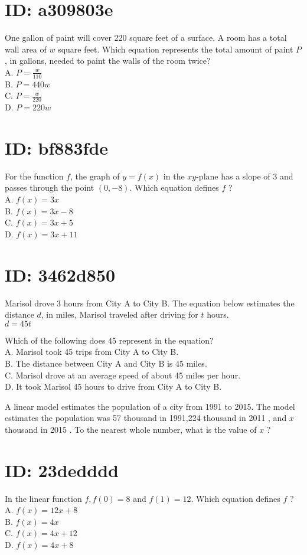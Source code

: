 \section*{ID: a309803e}
One gallon of paint will cover 220 square feet of a surface. A room has a total wall area of $w$ square feet. Which equation represents the total amount of paint $P$, in gallons, needed to paint the walls of the room twice?\\
A. $P=\frac{w}{110}$\\
B. $P=440 w$\\
C. $P=\frac{w}{220}$\\
D. $P=220 w$

\section*{ID: bf883fde}
For the function $f$, the graph of $y=f(x)$ in the $x y$-plane has a slope of 3 and passes through the point $(0,-8)$. Which equation defines $f$ ?\\
A. $f(x)=3 x$\\
B. $f(x)=3 x-8$\\
C. $f(x)=3 x+5$\\
D. $f(x)=3 x+11$

\section*{ID: 3462d850}
Marisol drove 3 hours from City A to City B. The equation below estimates the distance $d$, in miles, Marisol traveled after driving for $t$ hours.\\
$d=45 t$

Which of the following does 45 represent in the equation?\\
A. Marisol took 45 trips from City A to City B.\\
B. The distance between City A and City B is 45 miles.\\
C. Marisol drove at an average speed of about 45 miles per hour.\\
D. It took Marisol 45 hours to drive from City A to City B.

A linear model estimates the population of a city from 1991 to 2015. The model estimates the population was 57 thousand in 1991,224 thousand in 2011 , and $x$ thousand in 2015 . To the nearest whole number, what is the value of $x$ ?

\section*{ID: 23dedddd}
In the linear function $f, f(0)=8$ and $f(1)=12$. Which equation defines $f$ ?\\
A. $f(x)=12 x+8$\\
B. $f(x)=4 x$\\
C. $f(x)=4 x+12$\\
D. $f(x)=4 x+8$

